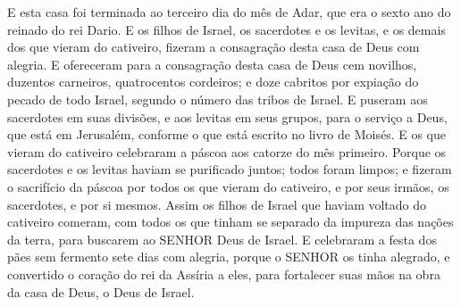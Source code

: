 {  E esta casa foi terminada ao terceiro dia do mês de Adar, que era o sexto ano do reinado do rei Dario.
  E os filhos de Israel, os sacerdotes e os levitas, e os demais dos que vieram do cativeiro, fizeram a consagração desta casa de Deus com alegria.
  E ofereceram para a consagração desta casa de Deus cem novilhos, duzentos carneiros, quatrocentos cordeiros; e doze cabritos por expiação do pecado de todo Israel, segundo o número das tribos de Israel.
  E puseram aos sacerdotes em suas divisões, e aos levitas em seus grupos, para o serviço a Deus, que está em Jerusalém, conforme o que está escrito no livro de Moisés.
  E os que vieram do cativeiro celebraram a páscoa aos catorze do mês primeiro.
  Porque os sacerdotes e os levitas haviam se purificado juntos; todos foram limpos; e fizeram o sacrifício da páscoa por todos os que vieram do cativeiro, e por seus irmãos, os sacerdotes, e por si mesmos.
  Assim os filhos de Israel que haviam voltado do cativeiro comeram, com todos os que tinham se separado da impureza das nações da terra, para buscarem ao SENHOR Deus de Israel.
  E celebraram a festa dos pães sem fermento sete dias com alegria, porque o SENHOR os tinha alegrado, e convertido o coração do rei da Assíria a eles, para fortalecer suas mãos na obra da casa de Deus, o Deus de Israel.
\par }

